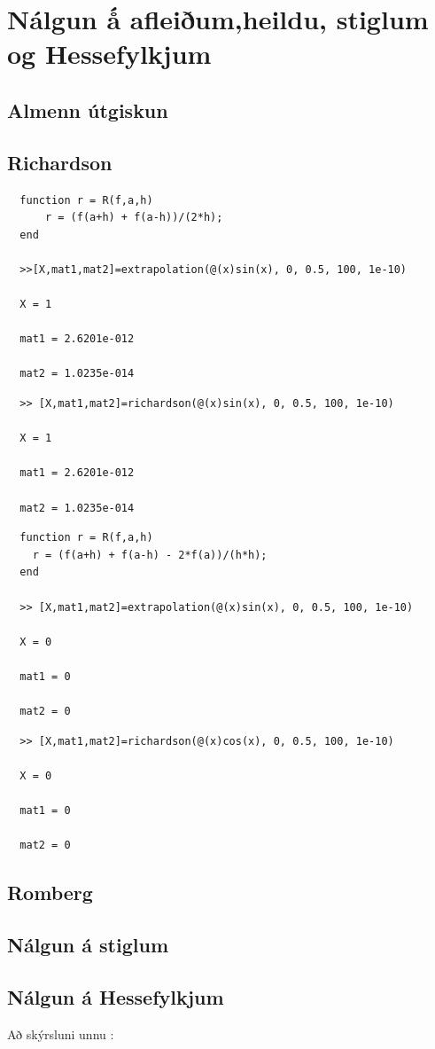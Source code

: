 \documentclass[a4]{article}
\begin{document}
\section{Nálgun ǻ afleiðum,heildu, stiglum og Hessefylkjum}
\subsection{Almenn útgiskun}

\subsection{Richardson}
\begin{lstlisting}
  function r = R(f,a,h)
      r = (f(a+h) + f(a-h))/(2*h);
  end

  >>[X,mat1,mat2]=extrapolation(@(x)sin(x), 0, 0.5, 100, 1e-10)

  X = 1 

  mat1 = 2.6201e-012

  mat2 = 1.0235e-014 
\end{lstlisting}

\begin{lstlisting}
  >> [X,mat1,mat2]=richardson(@(x)sin(x), 0, 0.5, 100, 1e-10)

  X = 1

  mat1 = 2.6201e-012

  mat2 = 1.0235e-014
\end{lstlisting}
\begin{lstlisting}
  function r = R(f,a,h)
    r = (f(a+h) + f(a-h) - 2*f(a))/(h*h);
  end

  >> [X,mat1,mat2]=extrapolation(@(x)sin(x), 0, 0.5, 100, 1e-10)

  X = 0

  mat1 = 0

  mat2 = 0
\end{lstlisting}

\begin{lstlisting}
  >> [X,mat1,mat2]=richardson(@(x)cos(x), 0, 0.5, 100, 1e-10)

  X = 0

  mat1 = 0

  mat2 = 0
\end{lstlisting}

\subsection{Romberg}
\subsection{Nálgun á stiglum}
\subsection{Nálgun á Hessefylkjum}
\vspace{20 mm}
Að skýrsluni unnu :
\hspace{0.5cm} \makebox[1.5in]{\hrulefill}
\hspace{0.5cm} \makebox[1.5in]{\hrulefill}
\hspace{0.5cm} \makebox[1.5in]{\hrulefill}
\end{document}
